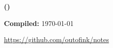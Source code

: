 \begin{titlepage}
    \centering
    {\huge\bfseries \thetitle \;(\thecoursenum) \par}
    {\LARGE \theinstructor\par}
    \vspace{1.5cm}
    {\Large \theauthor\par}
    {\large \thedate\par}
    \vfill
    \begin{center}
        {\large \textbf{Compiled:} \today \ \DTMcurrenttime\par}
        {\large \sffamily \url{https://github.com/outofink/notes}\par}
    \end{center}
\end{titlepage}

